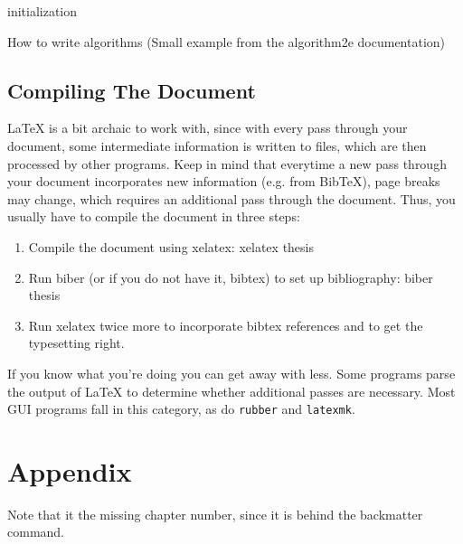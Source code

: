 \documentclass[12pt, %
a4paper, %
twoside, %
openright, %
abstract=on, %
DIV=11,      %
BCOR=8mm]{scrbook} %
\begin{document}
    \begin{algorithm}[t]
        \SetAlgoLined
        initialization\;
        \caption{How to write algorithms (Small example from the algorithm2e documentation)}
        \label{alg:exp}
    \end{algorithm}

    \section{Compiling The Document}
    \LaTeX{}  is  a bit  archaic  to  work  with,  since with  every  pass 
    through  your document,  some intermediate  information is  written to 
    files,  which are  then processed  by  other programs.   Keep in  mind 
    that  everytime a  new  pass through  your  document incorporates  new 
    information (e.g. from BibTeX), page breaks may change, which requires
    an  additional pass  through the  document. Thus, you  usually have  to
    compile the document in three steps:
    \begin{enumerate}
        \item Compile the document using xelatex: xelatex thesis
        \item Run biber  (or if  you do  not have  it, bibtex)  to set  up
              bibliography: biber thesis
        \item Run xelatex  twice more to incorporate  bibtex references and
              to get the typesetting right.
    \end{enumerate}

    If  you know  what  you're doing  you  can get  away  with less.   Some
    programs parse the  output of \LaTeX{} to  determine whether additional
    passes are necessary.  Most GUI programs fall in this category, as do
    \verb+rubber+ and \verb+latexmk+.

    \backmatter

    \chapter{Appendix}
    Note that it the missing chapter number,  since it is behind
    the backmatter command.

    \FloatBarrier

    \begin{singlespacing}
        \printbibliography
    \end{singlespacing}
\end{document}
